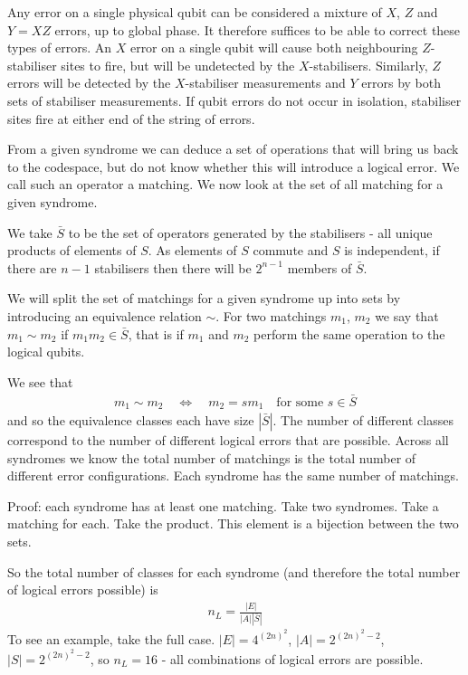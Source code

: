 Any error on a single physical qubit can be considered a mixture of $X$, $Z$ and $Y = XZ$ errors, up to global phase. It therefore suffices to be able to correct these types of errors. An $X$ error on a single qubit will cause both neighbouring $Z$-stabiliser sites to fire, but will be undetected by the $X$-stabilisers. Similarly, $Z$ errors will be detected by the $X$-stabiliser measurements and $Y$ errors by both sets of stabiliser measurements. If qubit errors do not occur in isolation, stabiliser sites fire at either end of the string of errors. 


From a given syndrome we can deduce a set of operations that will bring us back to the codespace, but do not know whether this will introduce a logical error. We call such an operator a matching. We now look at the set of all matching for a given syndrome.

We take $\bar{S}$ to be the set of operators generated by the stabilisers - all unique products of elements of $S$. As elements of $S$ commute and $S$ is independent, if there are $n-1$ stabilisers then there will be $2^{n-1}$ members of $\bar{S}$.

We will split the set of matchings for a given syndrome up into sets by introducing an equivalence relation $\sim$. For two matchings $m_1$, $m_2$ we say that $m_1 \sim m_2$ if $m_1m_2 \in \bar{S}$, that is if $m_1$ and $m_2$ perform the same operation to the logical qubits. 

We see that
\begin{align}
  m_1 \sim m_2 \quad \Leftrightarrow \quad m_2 = sm_1 \quad \text{for some $s\in\bar{S}$}
\end{align}
and so the equivalence classes each have size $|\bar{S}|$. The number of different classes correspond to the number of different logical errors that are possible. Across all syndromes we know the total number of matchings is the total number of different error configurations. Each syndrome has the same number of matchings.

Proof: each syndrome has at least one matching. Take two syndromes. Take a matching for each. Take the product. This element is a bijection between the two sets.

So the total number of classes for each syndrome (and therefore the total number of logical errors possible) is
\begin{align}
  n_L = \frac{|E|}{|A||\bar{S}|}
\end{align}
To see an example, take the full case. $|E| = 4^{(2n)^2}$, $|A| = 2^{(2n)^2-2}$, $|S| = 2^{(2n)^2 - 2}$, so $n_L = 16$ - all combinations of logical errors are possible.


